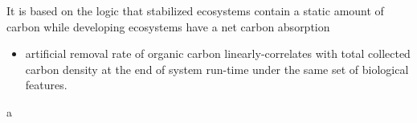 \documentclass[../thesis.tex]{subfiles} %
\begin{document}
It is based on the logic that stabilized ecosystems contain a static amount of carbon while developing ecosystems have a net carbon absorption

\begin{itemize}
    \item artificial removal rate of organic carbon linearly-correlates with total collected carbon density at the end of system run-time under the same set of biological features.
\end{itemize} %

a
\end{document}
